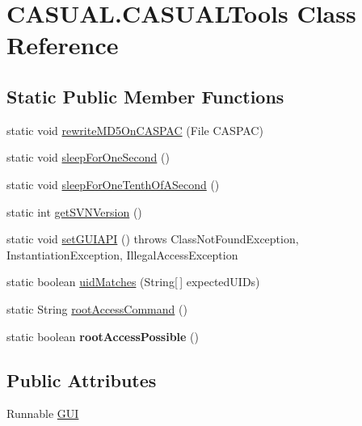 \hypertarget{class_c_a_s_u_a_l_1_1_c_a_s_u_a_l_tools}{\section{C\-A\-S\-U\-A\-L.\-C\-A\-S\-U\-A\-L\-Tools Class Reference}
\label{class_c_a_s_u_a_l_1_1_c_a_s_u_a_l_tools}
}
\subsection*{Static Public Member Functions}
\begin{DoxyCompactItemize}
\item 
static void \hyperlink{class_c_a_s_u_a_l_1_1_c_a_s_u_a_l_tools_acd6fb8c7fb16f067e2c923ddfc64ee3f}{rewrite\-M\-D5\-On\-C\-A\-S\-P\-A\-C} (File C\-A\-S\-P\-A\-C)
\item 
static void \hyperlink{class_c_a_s_u_a_l_1_1_c_a_s_u_a_l_tools_a2ee2f2b4ca75ee7da51a3a77b6c522e9}{sleep\-For\-One\-Second} ()
\item 
static void \hyperlink{class_c_a_s_u_a_l_1_1_c_a_s_u_a_l_tools_a4859317e1627454b077010e71ea286c8}{sleep\-For\-One\-Tenth\-Of\-A\-Second} ()
\item 
static int \hyperlink{class_c_a_s_u_a_l_1_1_c_a_s_u_a_l_tools_a35eb8131a3931202b95a2fe77c0f23bf}{get\-S\-V\-N\-Version} ()
\item 
static void \hyperlink{class_c_a_s_u_a_l_1_1_c_a_s_u_a_l_tools_a3d11cab02790b7080883bde3748f8d59}{set\-G\-U\-I\-A\-P\-I} ()  throws Class\-Not\-Found\-Exception, Instantiation\-Exception, Illegal\-Access\-Exception 
\item 
static boolean \hyperlink{class_c_a_s_u_a_l_1_1_c_a_s_u_a_l_tools_a45a0940755e238d3eaba37af1c1debca}{uid\-Matches} (String\mbox{[}$\,$\mbox{]} expected\-U\-I\-Ds)
\item 
static String \hyperlink{class_c_a_s_u_a_l_1_1_c_a_s_u_a_l_tools_ab2aee8f6d7e5630033b1fac1328b9555}{root\-Access\-Command} ()
\item 
\hypertarget{class_c_a_s_u_a_l_1_1_c_a_s_u_a_l_tools_a887862d654e35f2da3bb44ea44c19949}{static boolean {\bfseries root\-Access\-Possible} ()}\label{class_c_a_s_u_a_l_1_1_c_a_s_u_a_l_tools_a887862d654e35f2da3bb44ea44c19949}

\end{DoxyCompactItemize}
\subsection*{Public Attributes}
\begin{DoxyCompactItemize}
\item 
Runnable \hyperlink{class_c_a_s_u_a_l_1_1_c_a_s_u_a_l_tools_a06e15c1a4ff6aaf8b3b81ff74afb5e2d}{G\-U\-I}
\end{DoxyCompactItemize}
